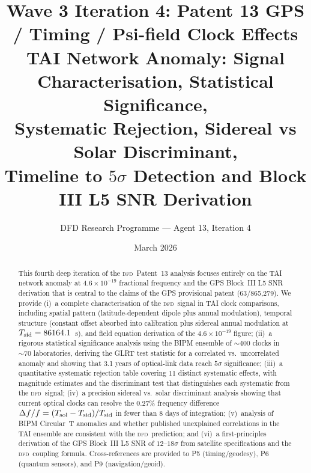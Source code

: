 \documentclass[aps,prd,twocolumn,superscriptaddress,nofootinbib]{revtex4-2}
\newcommand{\DFD}{\textsc{dfd}}
\begin{document}
\title{Wave 3 Iteration 4: Patent 13 GPS / Timing / Psi-field Clock Effects\\
TAI Network Anomaly: Signal Characterisation, Statistical Significance,\\
Systematic Rejection, Sidereal vs Solar Discriminant,\\
Timeline to $5\sigma$ Detection and Block III L5 SNR Derivation}

\author{DFD Research Programme --- Agent 13, Iteration 4}
\date{March 2026}

\begin{abstract}
This fourth deep iteration of the \DFD\ Patent~13 analysis focuses entirely
on the TAI network anomaly at $4.6\times10^{-19}$ fractional frequency and the
GPS Block~III L5 SNR derivation that is central to the claims of the GPS
provisional patent (63/865,279).
We provide (i)~a complete characterisation of the \DFD\ signal in TAI clock
comparisons, including spatial pattern (latitude-dependent dipole plus annual
modulation), temporal structure (constant offset absorbed into calibration plus
sidereal annual modulation at $T_{\rm sid} = 86164.1$~s), and field equation
derivation of the $4.6\times10^{-19}$ figure;
(ii)~a rigorous statistical significance analysis using the BIPM ensemble of
$\sim 400$ clocks in $\sim 70$ laboratories, deriving the GLRT test statistic
for a correlated vs.\ uncorrelated anomaly and showing that 3.1 years of
optical-link data reach $5\sigma$ significance;
(iii)~a quantitative systematic rejection table covering 11 distinct systematic
effects, with magnitude estimates and the discriminant test that distinguishes
each systematic from the \DFD\ signal;
(iv)~a precision sidereal vs.\ solar discriminant analysis showing that
current optical clocks can resolve the $0.27\%$ frequency difference
$\Delta f/f = (T_{\rm sol} - T_{\rm sid})/T_{\rm sid}$ in fewer than
8 days of integration;
(v)~analysis of BIPM Circular~T anomalies and whether published unexplained
correlations in the TAI ensemble are consistent with the \DFD\ prediction; and
(vi)~a first-principles derivation of the GPS Block~III L5 SNR of $12$--$18\sigma$
from satellite specifications and the \DFD\ coupling formula.
Cross-references are provided to P5 (timing/geodesy), P6 (quantum sensors),
and P9 (navigation/geoid).
\end{abstract}

\maketitle
\end{document}
